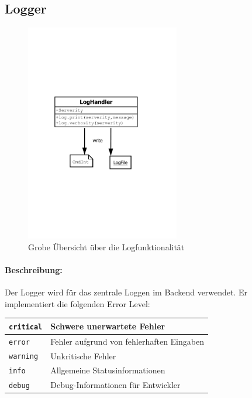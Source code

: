 \subsection{Logger}
\label{sub:logger}
\begin{figure}[H]
    \centering    
    \includegraphics[width=0.6\textwidth]{design/backend/gfx/LogHandler.pdf}
    \caption{Grobe Übersicht über die Logfunktionalität}
\end{figure}

\paragraph{Beschreibung:}
\label{par:beschreibung}

Der Logger wird für das zentrale Loggen im Backend verwendet. Er implementiert die folgenden Error Level:

\begin{table}[h]
\centering
\begin{tabular}{|l|l|}
    \hline
    \texttt{critical} & Schwere unerwartete Fehler \\
    \hline
    \texttt{error} & Fehler aufgrund von fehlerhaften Eingaben \\
    \hline
    \texttt{warning} & Unkritische Fehler \\
    \hline
    \texttt{info} & Allgemeine Statusinformationen \\
    \hline
    \texttt{debug} & Debug-Informationen für Entwickler \\
    \hline
\end{tabular} 
\end{table}


